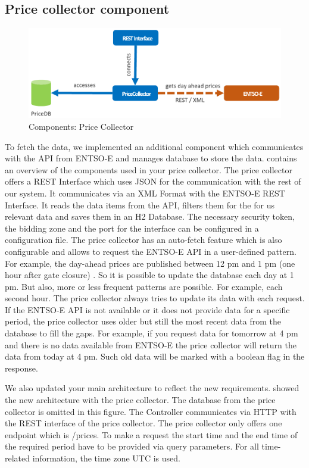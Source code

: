 \subsection{Price collector component}
\begin{figure}[htpb]
	\centering
	\includegraphics[width=1.00\textwidth]{../figures/priceCollector.pdf}
	\caption{Components: Price Collector}
	\label{fig:price}
\end{figure}
\noindent To fetch the data, we implemented an additional component which communicates with the API from ENTSO-E and manages database to store the data.  contains an overview of the components used in your price collector. The price collector offers a REST Interface which uses JSON for the communication with the rest of our system. It communicates via an XML Format with the ENTSO-E REST Interface. It reads the data items from the API, filters them for the for us relevant data and saves them in an H2 Database. The necessary security token, the bidding zone and the port for the interface can be configured in a configuration file. The price collector has an auto-fetch feature which is also configurable and allows to request the ENTSO-E API in a user-defined pattern. For example, the day-ahead prices are published between 12 pm and 1 pm (one hour after gate closure) \cite{ENTSO3}. So it is possible to update the database each day at 1 pm. But also, more or less frequent patterns are possible. For example, each second hour. The price collector always tries to update its data with each request. If the ENTSO-E API is not available or it does not provide data for a specific period, the price collector uses older but still the most recent data from the database to fill the gaps. For example, if you request data for tomorrow at 4 pm and there is no data available from ENTSO-E the price collector will return the data from today at 4 pm. Such old data will be marked with a boolean flag in the response.    



\noindent We also updated your main architecture to reflect the new requirements.  showed the new architecture with the price collector. The database from the price collector is omitted in this figure. The Controller communicates via HTTP with the REST interface of the price collector. The price collector only offers one endpoint which is \glqq/prices\grqq{}. To make a request the start time and the end time of the required period have to be provided via query parameters. For all time-related information, the time zone UTC is used. 

